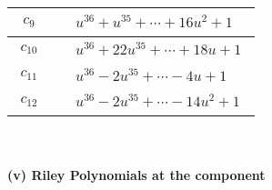 \documentclass[1p]{elsarticle_modified}
\theoremstyle{definition}
\begin{document}
\begin{tabular}{m{50pt}|m{274pt}}
\hline $$\begin{aligned}c_{9}\end{aligned}$$&$\begin{aligned}
&u^{36}+u^{35}+\cdots+16 u^2+1
\end{aligned}$\\
\hline $$\begin{aligned}c_{10}\end{aligned}$$&$\begin{aligned}
&u^{36}+22 u^{35}+\cdots+18 u+1
\end{aligned}$\\
\hline $$\begin{aligned}c_{11}\end{aligned}$$&$\begin{aligned}
&u^{36}-2 u^{35}+\cdots-4 u+1
\end{aligned}$\\
\hline $$\begin{aligned}c_{12}\end{aligned}$$&$\begin{aligned}
&u^{36}-2 u^{35}+\cdots-14 u^2+1
\end{aligned}$\\
\hline
\end{tabular}\\~\\
\newpage\renewcommand{\arraystretch}{1}
\flushleft \textbf{(v) Riley Polynomials at the component}\newline \\
\end{document}
